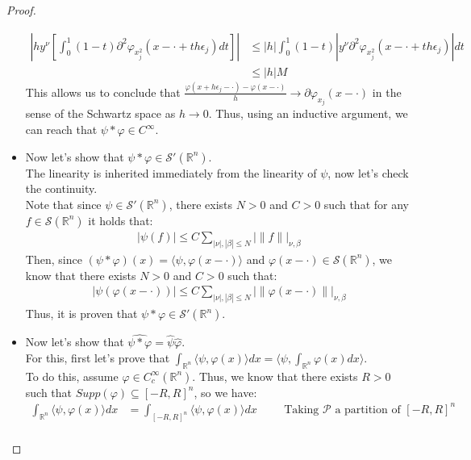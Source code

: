 \begin{proof}{}
\begin{itemize}
      \begin{align*}
        \left|hy^{\nu}\left[\int_{0}^{1}(1-t)\partial^{2}\varphi_{x^2_{j}}(x-\cdot+th\epsilon_j)dt\right]\right|&\leq |h|\int_{0}^{1}(1-t)|y^{\nu}\partial^{2}\varphi_{x^2_{j}}(x-\cdot+th\epsilon_j)|dt\\
        &\leq|h|M
      \end{align*}
      This allows us to conclude that $\frac{\varphi(x+h\epsilon_j-\cdot)-\varphi(x-\cdot)}{h} \rightarrow \partial\varphi_{x_j}(x-\cdot)$ in the sense of the Schwartz space as $h\rightarrow 0$.
      Thus, using an inductive argument, we can reach that $\psi*\varphi\in C^{\infty}$.
    \item Now let’s show that $\psi*\varphi \in\mathcal{S}'(\mathbb{R}^n)$.\\
      The linearity is inherited immediately from the linearity of $\psi$, now let’s check the continuity.\\
      Note that since $\psi\in\mathcal{S}'(\mathbb{R}^n)$, there exists $N>0$ and $C>0$ such that for any $f\in\mathcal{S}(\mathbb{R}^n)$ it holds that:
      \begin{align*}
        |\psi(f)|\leq C\sum_{|\nu|,|\beta|\leq N}|\|f\||_{\nu,\beta}
      \end{align*}
      Then, since $(\psi*\varphi)(x)=\langle \psi, \varphi(x-\cdot) \rangle$ and $\varphi(x-\cdot)\in\mathcal{S}(\mathbb{R}^n)$, we know that there exists $N>0$ and $C>0$ such that:
      \begin{align*}
        |\psi(\varphi(x-\cdot))|\leq C\sum_{|\nu|,|\beta|\leq N}|\|\varphi(x-\cdot)\||_{\nu,\beta}
      \end{align*}
      Thus, it is proven that $\psi*\varphi \in\mathcal{S}'(\mathbb{R}^n)$.
    \item Now let’s show that $\hat{\psi*\varphi}=\hat{\psi}\hat{\varphi}$.\\
      For this, first let’s prove that $\int_{\mathbb{R}^n}\langle \psi,\varphi(x) \rangle dx=\langle \psi,\int_{\mathbb{R}^n}\varphi(x)dx  \rangle$.\\
      To do this, assume $\varphi\in C^{\infty}_{c}(\mathbb{R}^n)$. Thus, we know that there exists $R>0$ such that $Supp(\varphi)\subseteq [-R,R]^n$, so we have:
      \begin{align*}
        \int_{\mathbb{R}^n}\langle \psi,\varphi(x) \rangle dx&=\int_{[-R,R]^n}\langle \psi,\varphi(x) \rangle dx \hspace{1cm}\text{Taking $\mathcal{P}$ a partition of $[-R,R]^n$}\\

\end{align*}
\end{itemize}
\end{proof}
